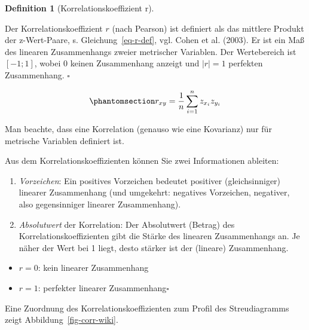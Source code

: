 \documentclass[
  letterpaper,
]{scrbook}
\providecommand{\tightlist}{%
  \setlength{\itemsep}{0pt}\setlength{\parskip}{0pt}}\usepackage{longtable,booktabs,array}
\theoremstyle{definition}
\theoremstyle{definition}
\theoremstyle{definition}
\newtheorem{definition}{Definition}[chapter]
\theoremstyle{remark}
\begin{document}
\begin{definition}[Korrelationskoeffizient
r]\protect\hypertarget{def-r}{}\label{def-r}

Der Korrelationskoeffizient \(r\) (nach Pearson) ist definiert als das
mittlere Produkt der z-Wert-Paare, s. Gleichung~\ref{eq-r-def}, vgl.
Cohen et al. (2003). Er ist ein Maß des linearen Zusammenhangs zweier
metrischer Variablen. Der Wertebereich ist \([-1;1]\), wobei 0 keinen
Zusammenhang anzeigt und \(|r|=1\) perfekten Zusammenhang. \(\square\)

\end{definition}

\begin{equation}\phantomsection\label{eq-r-def}{r_{xy}=\frac{1}{n}\sum_{i=1}^n z_{x_i} z_{y_i}}\end{equation}

Man beachte, dass eine Korrelation (genauso wie eine Kovarianz) nur für
metrische Variablen definiert ist.

Aus dem Korrelationskoeffizienten können Sie zwei Informationen
ableiten:

\begin{enumerate}
\def\labelenumi{\arabic{enumi}.}
\tightlist
\item
  \emph{Vorzeichen}: Ein positives Vorzeichen bedeutet positiver
  (gleichsinniger) linearer Zusammenhang (und umgekehrt: negatives
  Vorzeichen, negativer, also gegensinniger linearer Zusammenhang).
\item
  \emph{Absolutwert} der Korrelation: Der Absolutwert (Betrag) des
  Korrelationskoeffizienten gibt die Stärke des linearen Zusammenhangs
  an. Je näher der Wert bei 1 liegt, desto stärker ist der (lineare)
  Zusammenhang.
\end{enumerate}

\begin{itemize}
\tightlist
\item
  \(r = 0\): kein linearer Zusammenhang
\item
  \(r = 1\): perfekter linearer Zusammenhang\(\square\)
\end{itemize}

Eine Zuordnung des Korrelationskoeffizienten zum Profil des
Streudiagramms zeigt Abbildung~\ref{fig-corr-wiki}.
\end{document}
